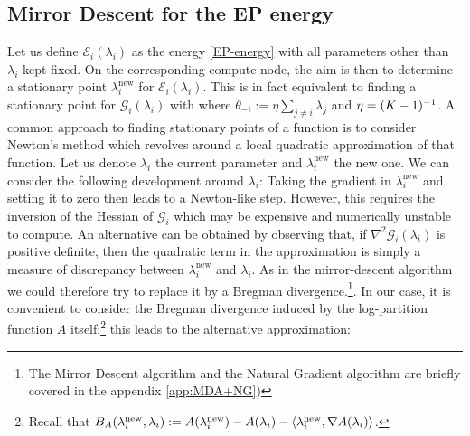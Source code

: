 \subsection{\label{point:MD-for-EP}Mirror Descent for the EP energy}
Let us define $\mathcal E_i(\lambda_i)$ as the energy \eqref{EP-energy} with all parameters other than $\lambda_i$ kept fixed. On the corresponding compute node, the aim is then to determine a stationary point $\lambda_i^{\text{new}}$ for $\mathcal E_i(\lambda_i)$. This is in fact equivalent to finding a stationary point for $\mathcal G_i(\lambda_i)$ with
where $\theta_{-i}:=\eta\sum_{j\neq i}\lambda_j$ and $\eta=(K-1)^{-1}$. A common approach to finding stationary points of a function is to consider Newton's method which revolves around a local quadratic approximation of that function. Let us denote $\lambda_i$ the current parameter and $\lambda_i^{\text{new}}$ the new one. We can consider the following development around $\lambda_i$:
%
%
Taking the gradient in $\lambda_i^{\text{new}}$ and setting it to zero then leads to a Newton-like step. However, this requires the inversion of the Hessian of $\mathcal G_i$ which may be expensive and numerically unstable to compute. An alternative can be obtained by observing that, if $\nabla^{2}\mathcal G_i(\lambda_i)$ is positive definite, then the quadratic term in the approximation is simply a measure of discrepancy between $\lambda_i^{\text{new}}$ and $\lambda_i$. As in the mirror-descent algorithm \citep{nemirovski83, beck03} we could therefore try to replace it by a Bregman divergence.\footnote{The Mirror Descent algorithm and the Natural Gradient algorithm are briefly covered in the appendix \ref{app:MDA+NG})}. In our case, it is convenient to consider the Bregman divergence induced by the log-partition function $A$ itself;\footnote{Recall that $B_A(\lambda_i^{\text{new}},\lambda_i):=A(\lambda_i^{\text{new}})-A(\lambda_i)-\left\langle \lambda_i^{\text{new}},\nabla A(\lambda_i) \right\rangle$.} this leads to the alternative approximation:
